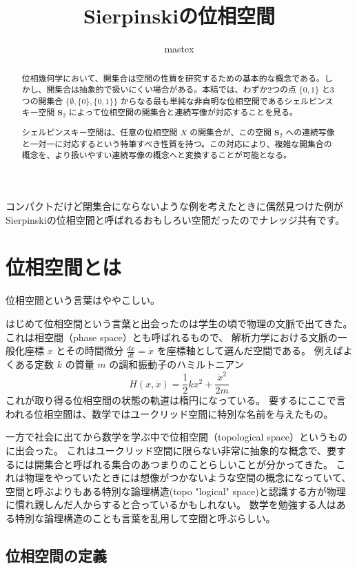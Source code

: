 \documentclass[uplatex,a4j,12pt,dvipdfmx]{jsarticle}
\title{
Sierpinskiの位相空間
}
\author{
mastex
}
\begin{document}
\maketitle

コンパクトだけど閉集合にならないような例を考えたときに偶然見つけた例がSierpinskiの位相空間と呼ばれるおもしろい空間だったのでナレッジ共有です。

\begin{abstract}
	位相幾何学において、開集合は空間の性質を研究するための基本的な概念である。しかし、開集合は抽象的で扱いにくい場合がある。本稿では、わずか2つの点 $\{0, 1\}$ と3つの開集合 $\{\emptyset, \{0\}, \{0, 1\}\}$ からなる最も単純な非自明な位相空間であるシェルピンスキー空間 $\mathbf{S}_ {2}$ によって位相空間の開集合と連続写像が対応することを見る。

	シェルピンスキー空間は、任意の位相空間 $X$ の開集合が、この空間 $\mathbf{S}_ {2}$ への連続写像と一対一に対応するという特筆すべき性質を持つ。この対応により、複雑な開集合の概念を、より扱いやすい連続写像の概念へと変換することが可能となる。
\end{abstract}

\section{位相空間とは}

位相空間という言葉はややこしい。

はじめて位相空間という言葉と出会ったのは学生の頃で物理の文脈で出てきた。
これは相空間（phase space）とも呼ばれるもので、
解析力学における文脈の一般化座標 $x$ とその時間微分 $\frac{dx}{dt} = \dot{x}$ を座標軸として選んだ空間である。
例えばよくある定数 $k$ の質量 $m$ の調和振動子のハミルトニアン
$$
	H(x,\dot{x}) = \frac{1}{2}kx^{2}  + \frac{\dot{x}^{2}}{2m}
$$
これが取り得る位相空間の状態の軌道は楕円になっている。
要するにここで言われる位相空間は、数学ではユークリッド空間に特別な名前を与えたもの。

一方で社会に出てから数学を学ぶ中で位相空間（topological space）というものに出会った。
これはユークリッド空間に限らない非常に抽象的な概念で、要するには開集合と呼ばれる集合のあつまりのことらしいことが分かってきた。
これは物理をやっていたときには想像がつかないような空間の概念になっていて、空間と呼ぶよりもある特別な論理構造(topo "logical" space)と認識する方が物理に慣れ親しんだ人からすると合っているかもしれない。
数学を勉強する人はある特別な論理構造のことも言葉を乱用して空間と呼ぶらしい。


\subsection{位相空間の定義}
\end{document}
